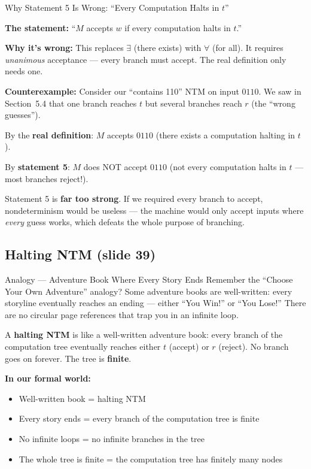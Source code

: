 \begin{examplebox}{Why Statement 5 Is Wrong: ``Every Computation Halts in $t$''}

\textbf{The statement:} ``$M$ accepts $w$ if every computation halts in $t$.''

\textbf{Why it's wrong:} This replaces $\exists$ (there exists) with $\forall$
(for all). It requires \emph{unanimous} acceptance --- every branch must accept.
The real definition only needs one.

\textbf{Counterexample:} Consider our ``contains 110'' NTM on input $0110$.
We saw in Section~5.4 that one branch reaches $t$ but several branches reach
$r$ (the ``wrong guesses'').

By the \textbf{real definition}: $M$ accepts $0110$ (there exists a computation
halting in $t$).

By \textbf{statement 5}: $M$ does NOT accept $0110$ (not every computation halts
in $t$ --- most branches reject!).

Statement 5 is \textbf{far too strong}. If we required every branch to accept,
nondeterminism would be useless --- the machine would only accept inputs where
\emph{every} guess works, which defeats the whole purpose of branching.

\end{examplebox}

\subsection{Halting NTM (slide 39)}
\label{subsec:halting-ntm}

\begin{notebox}{Analogy --- Adventure Book Where Every Story Ends}
Remember the ``Choose Your Own Adventure'' analogy? Some adventure books are
well-written: every storyline eventually reaches an ending --- either ``You
Win!'' or ``You Lose!'' There are no circular page references that trap you in
an infinite loop.

A \textbf{halting NTM} is like a well-written adventure book: every branch of
the computation tree eventually reaches either $t$ (accept) or $r$ (reject).
No branch goes on forever. The tree is \textbf{finite}.

\textbf{In our formal world:}
\begin{itemize}[nosep]
\item Well-written book = halting NTM
\item Every story ends = every branch of the computation tree is finite
\item No infinite loops = no infinite branches in the tree
\item The whole tree is finite = the computation tree has finitely many nodes
\end{itemize}
\end{notebox}

